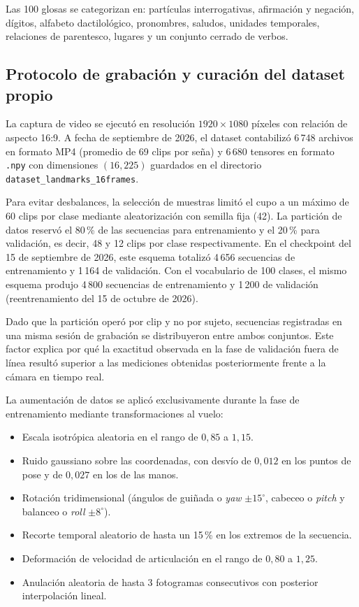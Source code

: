 Las 100 glosas se categorizan en: partículas interrogativas, afirmación y negación, dígitos, alfabeto dactilológico, pronombres, saludos, unidades temporales, relaciones de parentesco, lugares y un conjunto cerrado de verbos.

\subsection{Protocolo de grabación y curación del dataset propio}
La captura de video se ejecutó en resolución $1920 \times 1080$ píxeles con relación de aspecto 16:9. A fecha de septiembre de 2026, el dataset contabilizó 6\,748 archivos en formato MP4 (promedio de 69 clips por seña) y 6\,680 tensores en formato \texttt{.npy} con dimensiones $(16, 225)$ guardados en el directorio \texttt{dataset\_landmarks\_16frames}. 

Para evitar desbalances, la selección de muestras limitó el cupo a un máximo de 60 clips por clase mediante aleatorización con semilla fija (42). La partición de datos reservó el 80\,\% de las secuencias para entrenamiento y el 20\,\% para validación, es decir, 48 y 12 clips por clase respectivamente. En el checkpoint del 15 de septiembre de 2026, este esquema totalizó 4\,656 secuencias de entrenamiento y 1\,164 de validación. Con el vocabulario de 100 clases, el mismo esquema produjo 4\,800 secuencias de entrenamiento y 1\,200 de validación (reentrenamiento del 15 de octubre de 2026).

Dado que la partición operó por clip y no por sujeto, secuencias registradas en una misma sesión de grabación se distribuyeron entre ambos conjuntos. Este factor explica por qué la exactitud observada en la fase de validación fuera de línea resultó superior a las mediciones obtenidas posteriormente frente a la cámara en tiempo real.

La aumentación de datos se aplicó exclusivamente durante la fase de entrenamiento mediante transformaciones al vuelo:
\begin{itemize}
    \item Escala isotrópica aleatoria en el rango de $0{,}85$ a $1{,}15$.
    \item Ruido gaussiano sobre las coordenadas, con desvío de $0{,}012$ en los puntos de pose y de $0{,}027$ en los de las manos.
    \item Rotación tridimensional (ángulos de guiñada o \textit{yaw} $\pm 15^{\circ}$, cabeceo o \textit{pitch} y balanceo o \textit{roll} $\pm 8^{\circ}$).
    \item Recorte temporal aleatorio de hasta un 15\,\% en los extremos de la secuencia.
    \item Deformación de velocidad de articulación en el rango de $0{,}80$ a $1{,}25$.
    \item Anulación aleatoria de hasta 3 fotogramas consecutivos con posterior interpolación lineal.
\end{itemize}

